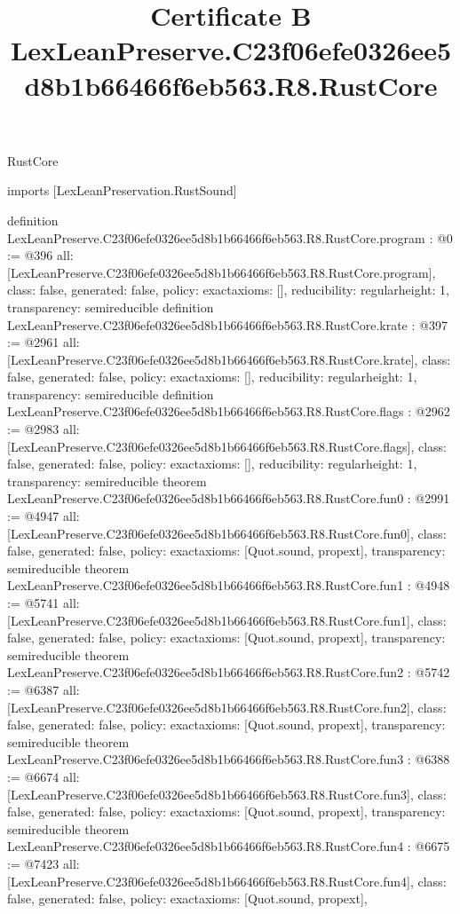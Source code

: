 \begin{lexlean}{RustCore}
\title{Certificate B LexLeanPreserve.C23f06efe0326ee5d8b1b66466f6eb563.R8.RustCore}
\begin{coremodule}
imports [LexLeanPreservation.RustSound]

definition LexLeanPreserve.C23f06efe0326ee5d8b1b66466f6eb563.R8.RustCore.program : @0 := @396 {
  all: [LexLeanPreserve.C23f06efe0326ee5d8b1b66466f6eb563.R8.RustCore.program],
  class: false,
  generated: false,
  policy: exact{axioms: []},
  reducibility: regular{height: 1},
  transparency: semireducible
}
definition LexLeanPreserve.C23f06efe0326ee5d8b1b66466f6eb563.R8.RustCore.krate : @397 := @2961 {
  all: [LexLeanPreserve.C23f06efe0326ee5d8b1b66466f6eb563.R8.RustCore.krate],
  class: false,
  generated: false,
  policy: exact{axioms: []},
  reducibility: regular{height: 1},
  transparency: semireducible
}
definition LexLeanPreserve.C23f06efe0326ee5d8b1b66466f6eb563.R8.RustCore.flags : @2962 := @2983 {
  all: [LexLeanPreserve.C23f06efe0326ee5d8b1b66466f6eb563.R8.RustCore.flags],
  class: false,
  generated: false,
  policy: exact{axioms: []},
  reducibility: regular{height: 1},
  transparency: semireducible
}
theorem LexLeanPreserve.C23f06efe0326ee5d8b1b66466f6eb563.R8.RustCore.fun0 : @2991 := @4947 {
  all: [LexLeanPreserve.C23f06efe0326ee5d8b1b66466f6eb563.R8.RustCore.fun0],
  class: false,
  generated: false,
  policy: exact{axioms: [Quot.sound, propext]},
  transparency: semireducible
}
theorem LexLeanPreserve.C23f06efe0326ee5d8b1b66466f6eb563.R8.RustCore.fun1 : @4948 := @5741 {
  all: [LexLeanPreserve.C23f06efe0326ee5d8b1b66466f6eb563.R8.RustCore.fun1],
  class: false,
  generated: false,
  policy: exact{axioms: [Quot.sound, propext]},
  transparency: semireducible
}
theorem LexLeanPreserve.C23f06efe0326ee5d8b1b66466f6eb563.R8.RustCore.fun2 : @5742 := @6387 {
  all: [LexLeanPreserve.C23f06efe0326ee5d8b1b66466f6eb563.R8.RustCore.fun2],
  class: false,
  generated: false,
  policy: exact{axioms: [Quot.sound, propext]},
  transparency: semireducible
}
theorem LexLeanPreserve.C23f06efe0326ee5d8b1b66466f6eb563.R8.RustCore.fun3 : @6388 := @6674 {
  all: [LexLeanPreserve.C23f06efe0326ee5d8b1b66466f6eb563.R8.RustCore.fun3],
  class: false,
  generated: false,
  policy: exact{axioms: [Quot.sound, propext]},
  transparency: semireducible
}
theorem LexLeanPreserve.C23f06efe0326ee5d8b1b66466f6eb563.R8.RustCore.fun4 : @6675 := @7423 {
  all: [LexLeanPreserve.C23f06efe0326ee5d8b1b66466f6eb563.R8.RustCore.fun4],
  class: false,
  generated: false,
  policy: exact{axioms: [Quot.sound, propext]},
}
\end{coremodule}
\end{lexlean}
